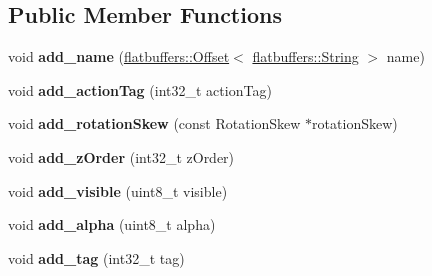 \subsection*{Public Member Functions}
\begin{DoxyCompactItemize}
\item 
\mbox{\label{structflatbuffers_1_1WidgetOptionsBuilder_a8e160a995fbf2039e11db86de009ba31}} 
void {\bfseries add\+\_\+name} (\hyperlink{structflatbuffers_1_1Offset}{flatbuffers\+::\+Offset}$<$ \hyperlink{structflatbuffers_1_1String}{flatbuffers\+::\+String} $>$ name)
\item 
\mbox{\label{structflatbuffers_1_1WidgetOptionsBuilder_a1be389abe251b5c6cabdd037604f8d77}} 
void {\bfseries add\+\_\+action\+Tag} (int32\+\_\+t action\+Tag)
\item 
\mbox{\label{structflatbuffers_1_1WidgetOptionsBuilder_a0efe061125271f68a20d9db9fbd99def}} 
void {\bfseries add\+\_\+rotation\+Skew} (const Rotation\+Skew $\ast$rotation\+Skew)
\item 
\mbox{\label{structflatbuffers_1_1WidgetOptionsBuilder_aeb25a35449db5c276bbbf0a54cf050f5}} 
void {\bfseries add\+\_\+z\+Order} (int32\+\_\+t z\+Order)
\item 
\mbox{\label{structflatbuffers_1_1WidgetOptionsBuilder_a60c58bb18ad652ed4186cd62647b035c}} 
void {\bfseries add\+\_\+visible} (uint8\+\_\+t visible)
\item 
\mbox{\label{structflatbuffers_1_1WidgetOptionsBuilder_a5381a34bc10f899e78dc4774e044b420}} 
void {\bfseries add\+\_\+alpha} (uint8\+\_\+t alpha)
\item 
\mbox{\label{structflatbuffers_1_1WidgetOptionsBuilder_a85d8c2f7025abf1b81056725293a3ac8}} 
void {\bfseries add\+\_\+tag} (int32\+\_\+t tag)
\item 
\mbox{\label{structflatbuffers_1_1WidgetOptionsBuilder_af9bf433c8828a6047f72729633193321}} 

\end{DoxyCompactItemize}
